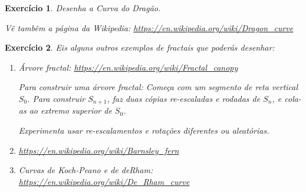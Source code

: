 \documentclass{article}
\newtheorem{ex}{Exercício}[section]
\begin{document}
\begin{ex}
Desenha a Curva do Dragão.

Vê tambêm a página da Wikipedia: \url{https://en.wikipedia.org/wiki/Dragon_curve}
\end{ex}

\begin{ex}
Eis alguns outros exemplos de fractais que poderás desenhar:

\begin{enumerate}
\item Árvore fractal: \url{https://en.wikipedia.org/wiki/Fractal_canopy}

Para construir uma árvore fractal: Começa com um segmento de reta vertical $S_0$. Para construir $S_{n+1}$, faz duas cópias re-escaladas e rodadas de $S_n$, e cola-as ao extremo superior de $S_0$.

Experimenta usar re-escalamentos e rotações diferentes ou aleatórias.

\item \url{https://en.wikipedia.org/wiki/Barnsley_fern}

\item Curvas de Koch-Peano e de deRham: \url{https://en.wikipedia.org/wiki/De_Rham_curve}
\end{enumerate}
\end{ex}
\end{document}

